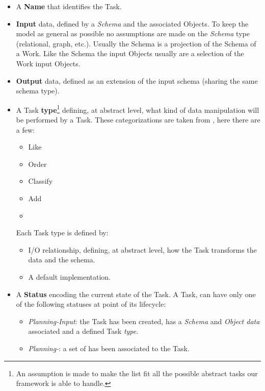 \begin{itemize}
    \item A \textbf{Name} that identifies the Task.

    \item \textbf{Input} data, defined by a \emph{Schema} and the associated
    Objects. To keep the model as general as possible no assumptions are made on
    the \emph{Schema} type (relational, graph, etc.). Usually the Schema
    is a projection of the Schema of a Work. Like the Schema the input Objects
    usually are a selection of the Work input Objects.
    \item \textbf{Output} data, defined as an extension of the input schema
    (sharing the same schema type).

    \item A Task \textbf{type}\footnote{An assumption is made to make the list fit
    all the possible abstract tasks our framework is able to handle.}
    defining, at abstract level, what kind of data manipulation will be performed
    by a Task. These categorizations are taken from \cite{paperboz}, here there are a
    few:
        \begin{itemize}
            \item Like
            \item Order
            \item Classify
            \item Add
            \item \omissis
        \end{itemize}
    \noindent Each Task type is defined by:
        \begin{itemize}
            \item I/O relationship, defining, at abstract level, how the Task
            transforms the data and the schema.
            \item A default implementation.
        \end{itemize}

    \item A \textbf{Status} encoding the current state of the Task. A Task, can
    have only one of the following statuses at point of its lifecycle:
        \begin{itemize}
            \item \emph{Planning-Input}: the Task has been created, has a
            \emph{Schema} and \emph{Object data} associated and a defined Task
            \emph{type}.

            \item \emph{Planning-\utask{}}: a set of \utask{} has been associated
            to the Task.
            

\end{itemize}
\end{itemize}
